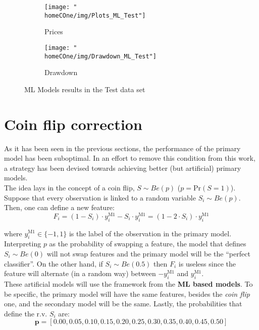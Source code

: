 \documentclass[a4paper]{report}
\newcommand{\homeCOne}{../../Chapter 1 - Metalabeling/Draft}
\begin{document}
\begin{figure}[htbp]
	\begin{subfigure}{.5\textwidth}
		\centering
		\texttt{[image: "\\homeCOne/img/Plots\_ML\_Test"]}
		\caption{Prices}
		\label{fig:Plots_ML_Test}
	\end{subfigure}%
	\begin{subfigure}{.5\textwidth}
		\centering
		\texttt{[image: "\\homeCOne/img/Drawdown\_ML\_Test"]}	
		\caption{Drawdown}	
		\label{fig:Drawdown_ML_Test}
	\end{subfigure}
	\caption{ML Models results in the Test data set}
	\label{fig:Results_ML_Test}
\end{figure}

\section{Coin flip correction}
\label{coinFlip} 
As it has been seen in the previous sections, the performance of the primary 
model has been suboptimal. In an effort to remove this condition from this 
work, a strategy has been devised towards achieving better (but artificial) 
primary models.\\

The idea lays in the concept of a coin flip, $S \sim Be(p)$ 
($p = \text{Pr}(S = 1)$). Suppose that every observation is linked to 
a random variable $S_i \sim Be(p)$. Then, one can define a new 
feature:
\begin{equation*}
	F_i = (1 - S_i) \cdot y_i^{\text{M1}} - S_i \cdot y_i^{\text{M1}} = 
	(1 - 2 \cdot S_i) \cdot y_i^{\text{M1}}
\end{equation*}

where $y_i^{\text{M1}} \in \{-1, 1\}$ is the label of the observation in 
the primary model.\\

Interpreting $p$ as the probability of swapping a feature, the model that 
defines $S_i \sim Be(0)$ will not swap features and the primary model will be 
the ``perfect classifier''. On the other hand, if $S_i \sim Be(0.5)$ then 
$F_i$ is useless since the feature will alternate (in a random way) between 
$-y_i^{\text{M1}}$ and $y_i^{\text{M1}}$.\\

These artificial models will use the framework from the \textbf{ML based 
models}. To be specific, the primary model will have the same features, 
besides the \textit{coin flip} one, and the secondary model will be the 
same. Lastly, the probabilities that define the r.v. $S_i$ are:
\begin{equation*}
	\textbf{p} = [0.00, 0.05, 0.10, 0.15, 0.20, 0.25, 0.30, 0.35, 
	0.40, 0.45, 	0.50]
\end{equation*}
\end{document}
